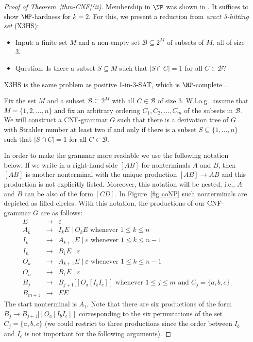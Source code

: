 \documentclass[a4paper,UKenglish,cleveref, autoref, thm-restate, numberwithinsect]{lipics-v2021}
\begin{document}
\begin{proof}[Proof of Theorem~\ref{thm-CNF}(ii)]
Membership in $\NP$ was shown in \cite{LRZ25}. 
It suffices to show $\NP$-hardness for $k = 2$. For this, we present a reduction from
\emph{exact 3-hitting set} (X3HS):
\begin{itemize}
\item Input: a finite set $M$ and a non-empty set $\mathcal{B} \subseteq 2^M$ of subsets of $M$, all of size 3.
\item Question: Is there a subset $S \subseteq M$ such that $|S \cap C|=1$ for all $C \in \mathcal{B}$? 
\end{itemize}
X3HS is the same problem as positive 1-in-3-SAT, which is $\NP$-complete \cite[Problem LO4]{GarJoh79}. 

Fix the set $M$ and a subset $\mathcal{B} \subseteq 2^M$ with all $C \in \mathcal{B}$ of size $3$. W.l.o.g.\ assume that
$M  = \{1,2,\ldots, n\}$ and fix an arbitrary ordering $C_1, C_2, \ldots, C_m$ of the subsets in $\mathcal{B}$.
We will construct a CNF-grammar $G$ such that there is a derivation tree of $G$ with Strahler number at least two if and only if
 there is a subset $S \subseteq \{1,\ldots,n\}$ such that $|S \cap C|=1$ for all $C \in \mathcal{B}$.
 
 In order to make the grammar more readable we use the following notation below. If we write in a right-hand side
 $[AB]$ \label{page-[AB]} for nonterminals $A$ and $B$, then $[AB]$ is another nonterminal with the unique production $[AB] \to AB$ and this
 production is not explicitly listed. Moreover, this notation will be nested, i.e., $A$ and $B$ can be also of the form $[CD]$.
 In Figure~\ref{fig coNP} such nonterminals are depicted as filled circles. 
 With this notation, the productions of our CNF-grammar $G$ are as follows: 
  \begin{eqnarray*}
 E & \to & \varepsilon \\
 A_k & \to & I_k E \mid O_k E \text{ whenever $1 \leq k \leq n$} \\
 I_k & \to & A_{k+1} E \mid \varepsilon   \text{ whenever $1 \leq k \leq n-1$} \\
  I_n & \to & B_1 E \mid \varepsilon  \\
 O_k & \to & A_{k+1} E \mid \varepsilon   \text{ whenever $1 \leq k \leq n-1$} \\
 O_n & \to & B_1 E \mid \varepsilon  \\
 B_j & \to & B_{j+1} [[O_a [I_b I_c]] \text{ whenever $1 \leq j \leq m$ and $C_j = \{a,b,c\}$} \\
 B_{m+1} & \to & EE 
 \end{eqnarray*}
 The start nonterminal is $A_1$. Note that there are six productions of the form $B_j  \to  B_{j+1} [[O_a [I_b I_c]]$
 corresponding to the six permutations of the set $C_j = \{a,b,c\}$ (we could restrict to three productions since the order
 between $I_b$ and $I_c$ is not important for the following arguments).
 

\end{proof}
\end{document}

